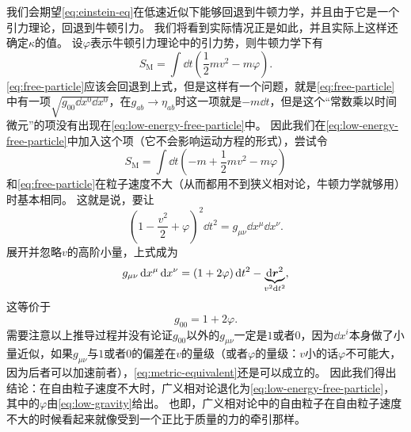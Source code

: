 \documentclass[hyperref, UTF8, a4paper]{ctexart}
\begin{document}
我们会期望\eqref{eq:einstein-eq}在低速近似下能够回退到牛顿力学，并且由于它是一个引力理论，回退到牛顿引力。
我们将看到实际情况正是如此，并且实际上这样还确定$\kappa$的值。
设$\varphi$表示牛顿引力理论中的引力势，则牛顿力学下有
\begin{equation}
    S_\text{M} = \int \dd{t} \left( \frac{1}{2} m v^2 - m \varphi \right).
    \label{eq:low-energy-free-particle}
\end{equation}
\eqref{eq:free-particle}应该会回退到上式，但是这样有一个问题，就是\eqref{eq:free-particle}中有一项$\sqrt{g_{00} \dd{x^0} \dd{x^0}}$，在$g_{ab} \to \eta_{ab}$时这一项就是$-m \dd{t}$，但是这个“常数乘以时间微元”的项没有出现在\eqref{eq:low-energy-free-particle}中。
因此我们在\eqref{eq:low-energy-free-particle}中加入这个项（它不会影响运动方程的形式），尝试令
\[
    S_\text{M} = \int \dd{t} \left( - m + \frac{1}{2} m v^2 - m \varphi \right)
\]
和\eqref{eq:free-particle}在粒子速度不大（从而都用不到狭义相对论，牛顿力学就够用）时基本相同。
这就是说，要让
\[
    \left( 1 - \frac{v^2}{2} + \varphi \right)^2 \dd{t^2} = g_{\mu \nu} \dd{x^\mu} \dd{x^\nu}.
\]
展开并忽略$v$的高阶小量，上式成为
\begin{equation}
    g_{\mu \nu} \dd{x^\mu} \dd{x^\nu} = (1 + 2 \varphi) \dd{t^2} - \underbrace{\dd{\vb*{r}^2}}_{v^2 \dd{t^2}},
    \label{eq:metric-equivalent}
\end{equation}
这等价于
\begin{equation}
    g_{00} = 1 + 2 \varphi.
    \label{eq:low-gravity}
\end{equation}
需要注意以上推导过程并没有论证$g_{00}$以外的$g_{\mu \nu}$一定是$1$或者$0$，因为$\dd{x^i}$本身做了小量近似，如果$g_{\mu \nu}$与$1$或者$0$的偏差在$v$的量级（或者$\varphi$的量级：$v$小的话$\varphi$不可能大，因为后者可以加速前者），\eqref{eq:metric-equivalent}还是可以成立的。
因此我们得出结论：在自由粒子速度不大时，广义相对论退化为\eqref{eq:low-energy-free-particle}，其中的$\varphi$由\eqref{eq:low-gravity}给出。
也即，广义相对论中的自由粒子在自由粒子速度不大的时候看起来就像受到一个正比于质量的力的牵引那样。
\end{document}
